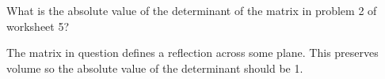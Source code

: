 \documentclass{exam}
\begin{document}
\begin{questions}
    \question
    What is the absolute value of the determinant of the matrix in problem 2 of
    worksheet 5?
    \begin{solution}
        The matrix in question defines a reflection across some plane. This
        preserves volume so the absolute value of the determinant should be 1.
    \end{solution}
\end{questions}
\end{document}
